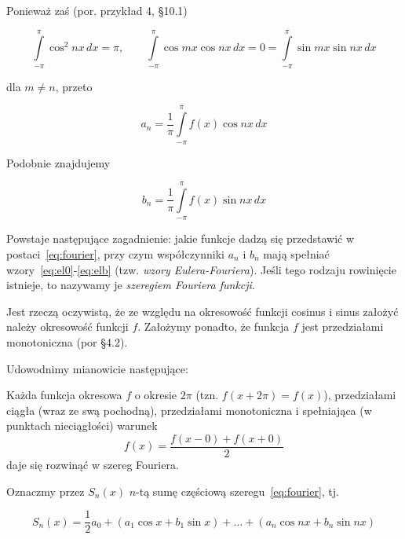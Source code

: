 \documentclass[leqno]{book}
\begin{document}
    Ponieważ zaś (por. przykład 4, \S 10.1)

    \[
        \int\limits_{-\pi}^{\pi} \cos^2 nx \,dx = \pi, \qquad
        \int\limits_{-\pi}^{\pi} \cos mx \cos nx \,dx = 0 = \int\limits_{-\pi}^{\pi} \sin mx \sin nx \,dx
    \]

    dla $m \neq n$, przeto

    \begin{equation}
        \label{eq:ela}
        a_n = \frac{1}{\pi} \int\limits_{-\pi}^{\pi} f(x) \cos nx \,dx
    \end{equation}

    Podobnie znajdujemy

    \begin{equation}
        \label{eq:elb}
        b_n = \frac{1}{\pi} \int\limits_{-\pi}^{\pi} f(x) \sin nx \,dx
    \end{equation}

    Powstaje następujące zagadnienie: jakie funkcje dadzą się przedstawić w postaci~\eqref{eq:fourier}, przy czym współczynniki $a_n$ i $b_n$ mają
    spełniać wzory~\eqref{eq:el0}-\eqref{eq:elb} (tzw. \textit{wzory Eulera-Fouriera}). Jeśli tego rodzaju rowinięcie istnieje, to nazywamy je \textit{szeregiem Fouriera funkcji}.

    Jest rzeczą oczywistą, że ze względu na okresowość funkcji cosinus i sinus założyć należy okresowość funkcji $f$.
    Założymy ponadto, że funkcja $f$ jest przedziałami monotoniczna (por \S 4.2).

    Udowodnimy mianowicie następujące:

    \begin{twierdzenie}
        Każda funkcja okresowa $f$ o okresie $2\pi$ (tzn. $f(x + 2\pi) = f(x)$), przedziałami ciągła (wraz ze swą pochodną),
        przedziałami monotoniczna i spełniająca (w punktach nieciągłości) warunek
        \begin{equation}
            \label{eq:statement}
            f(x) = \frac{f(x - 0) + f(x + 0)}{2}
        \end{equation}
        daje się rozwinąć w szereg Fouriera.
    \end{twierdzenie}

    Oznaczmy przez $S_n (x)$ $n$-tą sumę częściową szeregu~\eqref{eq:fourier}, tj.

    \begin{equation}
        \label{eq:sum}
        S_n(x) = \frac{1}{2} a_{0} + (a_1 \cos x + b_1 \sin x) + \ldots + (a_n \cos nx + b_n \sin nx)
    \end{equation}
\end{document}
